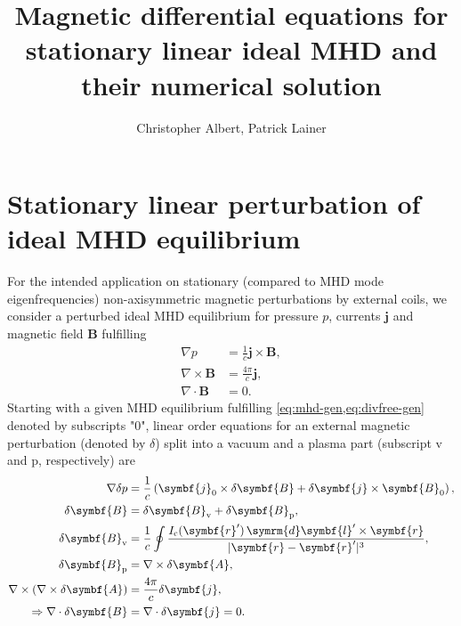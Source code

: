 \documentclass[a4paper, 10pt, english]{article}
\title{Magnetic differential equations for stationary linear ideal MHD and their numerical solution}
\author{Christopher Albert, Patrick Lainer}
\let\vec\symbf
\newcommand*\diff{\ensuremath{\symrm{d}}}  %
\begin{document}
\maketitle
\tableofcontents

\section{Stationary linear perturbation of ideal MHD equilibrium}

For the intended application on stationary (compared to MHD mode eigenfrequencies) non-axisymmetric magnetic perturbations by external coils, we consider a perturbed ideal MHD equilibrium for pressure $p$, currents $\vec{j}$ and magnetic field $\vec{B}$ fulfilling
\begin{align}
  \nabla p &= \frac{1}{c} \vec{j} \times \vec{B}, \label{eq:mhd-gen} \\
  \nabla \times \vec{B} &= \frac{4 \pi}{c} \vec{j}, \label{eq:ampere-gen} \\
  \nabla \cdot \vec{B} &= 0. \label{eq:divfree-gen}
\end{align}
Starting with a given MHD equilibrium fulfilling \cref{eq:mhd-gen,eq:divfree-gen} denoted by subscripts "$0$", linear order equations for an external magnetic perturbation (denoted by $\delta$) split into a vacuum and a plasma part (subscript $\text{v}$ and $\text{p}$, respectively) are
\begin{align}
  \nabla \delta p &= \frac{1}{c} \left( \vec{j}_{0} \times \delta \vec{B} + \delta \vec{j} \times \vec{B}_{0} \right), \label{eq:mhd} \\
  \delta \vec{B} &= \delta \vec{B}_{\text{v}} + \delta \vec{B}_{\text{p}}, \\
  \delta \vec{B}_{\text{v}} &= \frac{1}{c} \oint \frac{I_{\text{c}}(\vec{r}') \, \diff \vec{l}' \times \vec{r}}{\lvert \vec{r} - \vec{r}' \rvert^{3}}, \\
  \delta \vec{B}_{\text{p}} &= \nabla \times \delta \vec{A}, \\
  \nabla \times (\nabla \times \delta \vec{A}) &= \frac{4 \pi}{c} \delta \vec{j}, \label{eq:ampere} \\
  \Rightarrow \nabla \cdot \delta \vec{B} &= \nabla \cdot \delta \vec{j} = 0. \label{eq:divfree}
\end{align}
\end{document}
